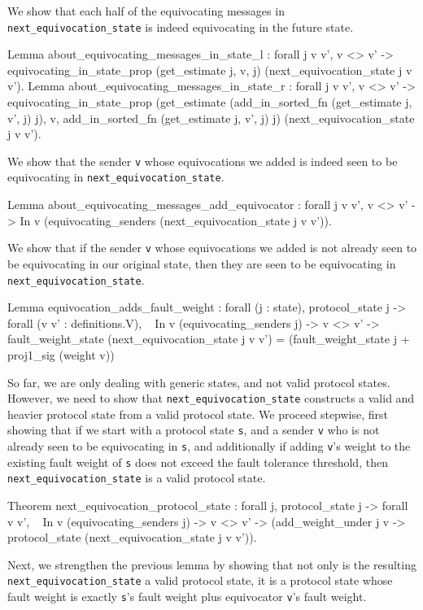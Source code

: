 \documentclass[runningheads]{llncs}
\begin{document}
We show that each half of the equivocating messages in \verb|next_equivocation_state|  is indeed equivocating in the future state. 
\begin{coq}
Lemma about_equivocating_messages_in_state_l :
	forall j v v',
	v <> v' ->
	equivocating_in_state_prop (get_estimate j, v, j)
	(next_equivocation_state j v v').
Lemma about_equivocating_messages_in_state_r :
	forall j v v',
	v <> v' ->
	equivocating_in_state_prop (get_estimate (add_in_sorted_fn (get_estimate j, v', j) j), v, add_in_sorted_fn (get_estimate j, v', j) j)
	(next_equivocation_state j v v').
\end{coq}
We show that the sender \verb|v| whose equivocations we added is indeed seen to be equivocating in \verb|next_equivocation_state|. 
\begin{coq}
	Lemma about_equivocating_messages_add_equivocator :
	forall j v v',
	v <> v' ->
	In v (equivocating_senders (next_equivocation_state j v v')).
\end{coq}
We show that if the sender \verb|v| whose equivocations we added is not already seen to be equivocating in our original state, then they are seen to be equivocating in \verb|next_equivocation_state|. 
\begin{coq}
Lemma equivocation_adds_fault_weight : 
	forall (j : state),
	protocol_state j ->
	forall (v v' : definitions.V),
	~ In v (equivocating_senders j) -> 
	v <> v' ->  
	fault_weight_state (next_equivocation_state j v v') = 
	(fault_weight_state j + proj1_sig (weight v))%
\end{coq}
So far, we are only dealing with generic states, and not valid protocol states. However, we need to show that \verb|next_equivocation_state| constructs a valid and heavier protocol state from a valid protocol state. We proceed stepwise, first showing that if we start with a protocol state \verb|s|, and a sender \verb|v| who is not already seen to be equivocating in \verb|s|, and additionally if adding \verb|v|'s weight to the existing fault weight of \verb|s| does not exceed the fault tolerance threshold, then \verb|next_equivocation_state| is a valid protocol state.
\begin{coq}
Theorem next_equivocation_protocol_state :
	forall j,
	protocol_state j ->
	forall v v',
	~ In v (equivocating_senders j) -> 
	v <> v' -> 
	(add_weight_under j v ->
	protocol_state (next_equivocation_state j v v')).
\end{coq} 	
Next, we strengthen the previous lemma by showing that not only is the resulting \verb|next_equivocation_state| a valid protocol state, it is a protocol state whose fault weight is exactly \verb|s|'s fault weight plus equivocator \verb|v|'s fault weight. 
\end{document}
